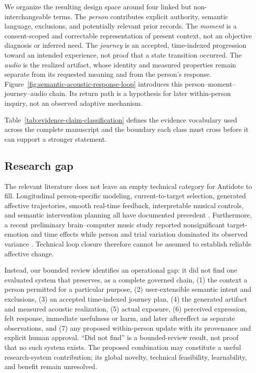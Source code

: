 We organize the resulting design space around four linked but
non-interchangeable terms. The \emph{person} contributes explicit authority,
semantic language, exclusions, and potentially relevant prior records. The
\emph{moment} is a consent-scoped and correctable representation of present
context, not an objective diagnosis or inferred need. The \emph{journey} is an
accepted, time-indexed progression toward an intended experience, not proof
that a state transition occurred. The \emph{audio} is the realized artifact,
whose identity and measured properties remain separate from its requested
meaning and from the person's response. Figure~\ref{fig:semantic-acoustic-response-loop}
introduces this person--moment--journey--audio chain. Its return path is a
hypothesis for later within-person inquiry, not an observed adaptive mechanism.


Table~\ref{tab:evidence-claim-classification} defines the evidence vocabulary
used across the complete manuscript and the boundary each class must cross
before it can support a stronger statement.


\subsection{Research gap}
\label{sec:research-gap}

The relevant literature does not leave an empty technical category for
Antidote to fill. Longitudinal person-specific modeling, current-to-target
selection, generated affective trajectories, smooth real-time feedback,
interpretable musical controls, and semantic intervention planning all have
documented precedent \citep{janssen2012tune,daly2016abcmi,
ehrlich2019closedloop,agres2023affectmachine,zhang2026mindmelody}.
Furthermore, a recent preliminary brain--computer music study reported
nonsignificant target-emotion and time effects while person and trial variation
dominated its observed variance \citep{monroy2026minimalist}. Technical loop
closure therefore cannot be assumed to establish reliable affective change.

Instead, our bounded review identifies an operational gap: it did not find one
evaluated system that preserves, as a complete governed chain, (1) the context
a person permitted for a particular purpose, (2) user-extensible semantic
intent and exclusions, (3) an accepted time-indexed journey plan, (4) the
generated artifact and measured acoustic realization, (5) actual exposure,
(6) perceived expression, felt response, immediate usefulness or harm, and
later aftereffect as separate observations, and (7) any proposed within-person
update with its provenance and explicit human approval. ``Did not find'' is a
bounded-review result, not proof that no such system exists. The proposed
combination may constitute a useful research-system contribution; its global
novelty, technical feasibility, learnability, and benefit remain unresolved.

